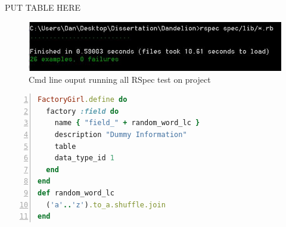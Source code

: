 \documentclass[a4paper,12pt]{article}
\begin{document}
\par PUT TABLE HERE




\begin{figure}
\includegraphics[width=\linewidth]{screenshots/mytestresult}
\caption{Cmd line ouput running all RSpec test on project}
\label{fig:mytestresult}
\end{figure}
\begin{lstlisting}[frame=single,numbers=left,language = ruby,caption= {Factory for field}, label={code:fgirl}]
FactoryGirl.define do
  factory :field do
    name { "field_" + random_word_lc }
    description "Dummy Information"
    table
    data_type_id 1
  end
end
def random_word_lc
  ('a'..'z').to_a.shuffle.join
end
\end{lstlisting}
\end{document}
